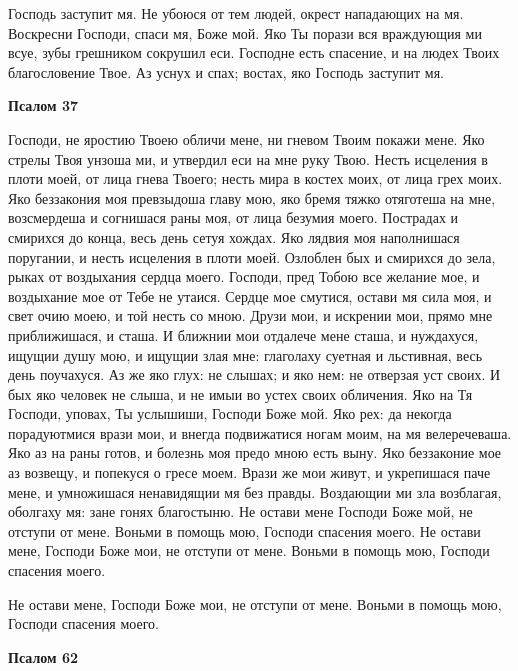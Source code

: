 Господь заступит мя. Не убоюся от тем людей, окрест нападающих на мя.
Воскресни Господи, спаси мя, Боже мой. Яко Ты порази вся враждующия
ми всуе, зубы грешником сокрушил еси. Господне есть спасение, и на людех
Твоих благословение Твое. Аз уснух и спах; востах, яко Господь заступит
мя.






 

\bfseries Псалом 37\normalfont{}


   Господи, не яростию Твоею обличи мене, ни гневом Твоим покажи мене.
Яко стрелы Твоя унзоша ми, и утвердил еси на мне руку Твою. Несть
исцеления в плоти моей, от лица гнева Твоего; несть мира в костех моих, от
лица грех моих. Яко беззакония моя превзыдоша главу мою, яко бремя
тяжко отяготеша на мне, возсмердеша и согнишася раны моя, от лица
безумия моего. Пострадах и смирихся до конца, весь день сетуя хождах. Яко
лядвия моя наполнишася поругании, и несть исцеления в плоти моей.
Озлоблен бых и смирихся до зела, рыках от воздыхания сердца моего.
Господи, пред Тобою все желание мое, и воздыхание мое от Тебе
не утаися. Сердце мое смутися, остави мя сила моя, и свет очию
моею, и той несть со мною. Друзи мои, и искрении мои, прямо мне
приближишася, и сташа. И ближнии мои отдалече мене сташа, и
нуждахуся, ищущии душу мою, и ищущии злая мне: глаголаху суетная и
льстивная, весь день поучахуся. Аз же яко глух: не слышах; и яко нем:
не отверзая уст своих. И бых яко человек не слыша, и не имыи во
устех своих обличения. Яко на Тя Господи, уповах, Ты услышиши,
Господи Боже мой. Яко рех: да некогда порадуютмися врази мои, и
внегда подвижатися ногам моим, на мя велеречеваша. Яко аз на
раны готов, и болезнь моя предо мною есть выну. Яко беззаконие
мое аз возвещу, и попекуся о гресе моем. Врази же мои живут, и
укрепишася паче мене, и умножишася ненавидящии мя без правды.
Воздающии ми зла возблагая, оболгаху мя: зане гонях благостыню.
Не остави мене Господи Боже мой, не отступи от мене. Воньми в
помощь мою, Господи спасения моего. Не остави мене, Господи Боже
мои, не отступи от мене. Воньми в помощь мою, Господи спасения
моего.


   Не остави мене, Господи Боже мои, не отступи от мене. Воньми в помощь
мою, Господи спасения моего.







 

\bfseries Псалом 62\normalfont{}


